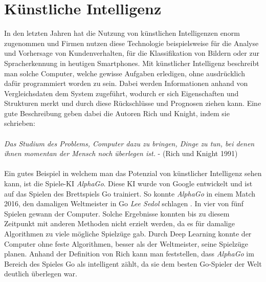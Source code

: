 \section{Künstliche Intelligenz}\label{s.ki}
In den letzten Jahren hat die Nutzung von künstlichen Intelligenzen enorm zugenommen und Firmen nutzen diese Technologie beispielsweise für die Analyse und Vorhersage von Kundenverhalten, für die Klassifikation von Bildern oder zur Spracherkennung in heutigen Smartphones. Mit künstlicher Intelligenz beschreibt man solche Computer, welche gewisse Aufgaben erledigen, ohne ausdrücklich dafür programmiert worden zu sein. Dabei werden Informationen anhand von Vergleichsdaten dem System zugeführt, wodurch er sich Eigenschaften und Strukturen merkt und durch diese Rückschlüsse und Prognosen ziehen kann. Eine gute Beschreibung geben dabei die Autoren Rich und Knight, indem sie schrieben:\\\\
 \textit{Das Studium des Problems, Computer dazu zu bringen, Dinge zu tun, bei denen ihnen momentan der Mensch noch überlegen ist.} - (Rich und Knight 1991)\\\\
Ein gutes Beispiel in welchem man das Potenzial von künstlicher Intelligenz sehen kann, ist die Spiele-KI  \textit{AlphaGo}. Diese KI wurde von Google entwickelt und ist auf das Spielen des Brettspiels Go trainiert. So konnte \textit{AlphaGo} in einem Match 2016, den damaligen Weltmeister in Go \textit{Lee Sedol} schlagen \cite{Alpha2016GO}. In vier von fünf Spielen gewann der Computer. Solche Ergebnisse konnten bis zu diesem Zeitpunkt mit anderen Methoden nicht erzielt werden, da es für damalige Algorithmen zu viele mögliche Spielzüge gab. Durch Deep Learning konnte der Computer ohne feste Algorithmen, besser als der Weltmeister, seine Spielzüge planen. Anhand der Definition von Rich kann man feststellen, dass  \textit{AlphaGo}  im Bereich des Spieles Go als intelligent zählt, da sie dem besten Go-Spieler der Welt deutlich überlegen war.
